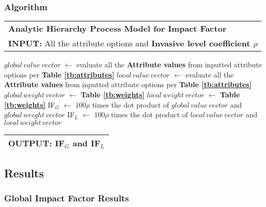 \documentclass[12pt]{article}
\newcommand{\toB}[1]{\color{blue}#1\color{black}}
\begin{document}
		\subsubsection{Algorithm}	
		\vspace{-0.4cm}
		{
			\fontsize{10}{14}\selectfont
			{
				\setlength{\parindent}{-1em}
				
				{
					\fontsize{12}{18}\selectfont
					\begin{longtable}{p{6.65in}}
						\toprule
						\textbf{Analytic Hierarchy Process Model for Impact Factor}\\
						\textbf{INPUT:} All the attribute options and \textbf{Invasive level coefficient $\rho$} \\
						\bottomrule
					\end{longtable}
				}
				
				\vspace{-0.5em}
				\begin{algorithmic}
					\State \toB{$global\,value\,vector$ } $\gets$ evaluate all the \textbf{Attribute values} from inputted attribute options per \textbf{Table \ref{tb:attributes}}
					\State \toB{$local\,value\,vector$ } $\gets$ evaluate all the \textbf{Attribute values} from inputted attribute options  per \textbf{Table \ref{tb:attributes}}
					\State \toB{$global\,weight\,vector$ } $\gets$ \textbf{Table \ref{tb:weights}}
					\State \toB{$local\,weight\,vector$ } $\gets$ \textbf{Table \ref{tb:weights}}
					\State \toB{IF$_G$ } $\gets$ \toB{$100\rho$ } times the dot product of \toB{$global\,value\,vector$ } and \toB{$global\,weight\,vector$ }
					\State \toB{IF$_L$ } $\gets$ \toB{$100\rho$ } times the dot product of \toB{$local\,value\,vector$ } and \toB{$local\,weight\,vector$ }
				\end{algorithmic}
				
				{
					\fontsize{12}{18}\selectfont
					\begin{longtable}{p{6.6in}}
						\toprule
						\textbf{OUTPUT:} \toB{IF$_G$ } and \toB{IF$_L$}\\
						\bottomrule
					\end{longtable}
				}
			}
		}	
		
	\subsection{Results}
	\subsubsection{Global Impact Factor Results}
		
\end{document}
